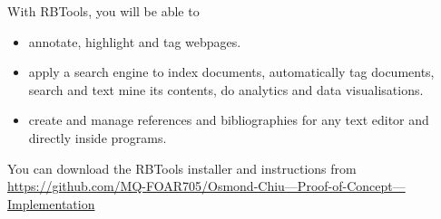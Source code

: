 \documentclass[unknownkeysallowed,usepdftitle=false, parskip=full, aspectratio=169]{beamer}
\newcommand{\secvariable}{nothing}
\newcommand{\mysection}[1]{\renewcommand{\secvariable}{#1}
}
\begin{document}
\mysection{conclusion}
\begin{frame}\label{\secvariable}
  
With RBTools, you will be able to  
  \begin{itemize}
   \item annotate, highlight and tag webpages. 
  \item apply a search engine to index documents, automatically tag documents, search and text mine its contents, do analytics and data visualisations.
  \item create and manage references and bibliographies for any text editor and directly inside programs.

  \end{itemize}

  \vspace{0.5cm}

You can download the RBTools installer and instructions from \href{https://github.com/MQ-FOAR705/Osmond-Chiu---Proof-of-Concept---Implementation}{https://github.com/MQ-FOAR705/Osmond-Chiu---Proof-of-Concept---Implementation}

\end{frame}
\end{document}
